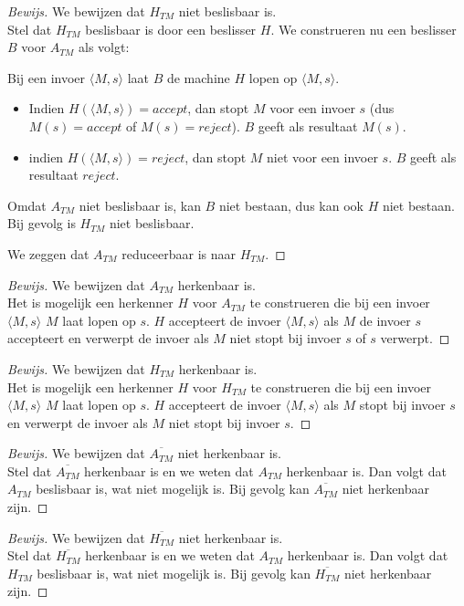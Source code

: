 \documentclass[a4paper]{article}
\newenvironment{bewijs}[1]%
  {\begin{mdframed}[topline=true,
    rightline=true,
    leftline=true,
    bottomline=true]\begin{proof}[Bewijs]#1\\[.2cm]\normalfont}%
  {\end{proof}\end{mdframed}}
\newcommand{\atm}{\ensuremath{{A_{TM}}}}
\newcommand{\htm}{\ensuremath{{H_{TM}}}}
\begin{document}
\begin{bewijs}{We bewijzen dat $\htm$ niet beslisbaar is.}
Stel dat $\htm$ beslisbaar is door een beslisser $H$. We construeren nu een beslisser $B$ voor $\atm$ als volgt:

Bij een invoer $\langle M,s \rangle$ laat $B$ de machine $H$ lopen op $\langle M,s \rangle$.
\begin{itemize}
\item Indien $H(\langle M,s \rangle) = accept$, dan stopt $M$ voor een invoer $s$ (dus $M(s) = accept$ of $M(s) = reject$). $B$ geeft als resultaat $M(s)$.
\item indien $H(\langle M,s \rangle) = reject$, dan stopt $M$ niet voor een invoer $s$. $B$ geeft als resultaat $reject$.
\end{itemize}
Omdat $\atm$ niet beslisbaar is, kan $B$ niet bestaan, dus kan ook $H$ niet bestaan. Bij gevolg is $\htm$ niet beslisbaar.

We zeggen dat $\atm$ reduceerbaar is naar $\htm$.
\end{bewijs}

\begin{bewijs}{We bewijzen dat $\atm$ herkenbaar is.}
  Het is mogelijk een herkenner $H$ voor $\atm$ te construeren die bij een invoer $\langle M,s \rangle$ $M$ laat lopen op $s$. $H$ accepteert de invoer $\langle M,s \rangle$ als $M$ de invoer $s$ accepteert en verwerpt de invoer als $M$ niet stopt bij invoer $s$ of $s$ verwerpt.
\end{bewijs}

\begin{bewijs}{We bewijzen dat $\htm$ herkenbaar is.}
  Het is mogelijk een herkenner $H$ voor $\htm$ te construeren die bij een invoer $\langle M,s \rangle$ $M$ laat lopen op $s$. $H$ accepteert de invoer $\langle M,s \rangle$ als $M$ stopt bij invoer $s$ en verwerpt de invoer als $M$ niet stopt bij invoer $s$.
\end{bewijs}

\begin{bewijs}{We bewijzen dat $\overline{\atm}$ niet herkenbaar is.}
  Stel dat $\overline{\atm}$ herkenbaar is en we weten dat $\atm$ herkenbaar is. Dan volgt dat $\atm$ beslisbaar is, wat niet mogelijk is. Bij gevolg kan $\overline{\atm}$ niet herkenbaar zijn. 
\end{bewijs}

\begin{bewijs}{We bewijzen dat $\overline{\htm}$ niet herkenbaar is.}
  Stel dat $\overline{\htm}$ herkenbaar is en we weten dat $\atm$ herkenbaar is. Dan volgt dat $\htm$ beslisbaar is, wat niet mogelijk is. Bij gevolg kan $\overline{\htm}$ niet herkenbaar zijn. 
\end{bewijs}
\end{document}
